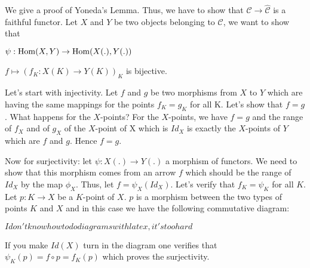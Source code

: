 \documentclass[12pt]{article}
\begin{document}
We give a proof of Yoneda's Lemma. Thus, we have to show that  $\mathcal{C}\to\hat{\mathcal{C}}$ is a faithful functor. Let $X$ and $Y$ be two objects belonging to $\mathcal{C}$, we want to show that 


$\psi : {\rm Hom}(X,Y)\to {\rm Hom}(X(.),Y(.))$  

$f\mapsto (f_K:X(K)\to Y(K))_K$      is bijective.

Let's start with injectivity. Let $f$ and $g$ be two morphisms from $X$ to $Y$ which are having the same mappings for the points $f_K=g_K$ for all K. Let's show that $f=g$. What happens for the $X$-points? For the $X$-points, we have $f=g$ and the range of $f_X$ and of $g_X$ of the $X$-point of X which is $Id_X$ is exactly the $X$-points of $Y$ which are $f$ and $g$. Hence $f=g$.

Now for surjectivity: let $\psi: X(.)\to Y(.)$ a morphism of functors. We need to show that this morphism comes from an arrow $f$ which should be the range of $Id_X$ by the map $\phi_X$. Thus, let $f=\psi_X(Id_X)$. 
Let's verify that $f_K=\psi_K$ for all $K$. Let $p:K\to X$ be a $K$-point of $X$. $p$ is a morphism between the two types of points $K$ and $X$ and in this case we have the following commutative diagram:

$I don't know how to do diagrams with latex, it's too hard$

If you make $Id(X)$ turn in the diagram one verifies that $\psi_K(p)=f\circ p=f_K(p)$ which proves the surjectivity.
\end{document}

